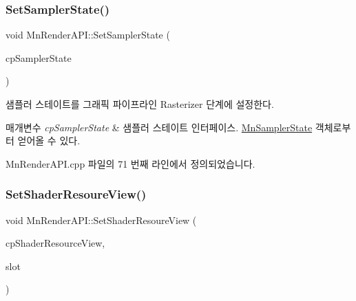 \mbox{\label{class_m_n_l_1_1_mn_render_a_p_i_a3d3c68e7fe4912e974d89ceeb357793e}} 
\subsubsection{\texorpdfstring{Set\+Sampler\+State()}{SetSamplerState()}}
{\footnotesize\ttfamily void Mn\+Render\+A\+P\+I\+::\+Set\+Sampler\+State (\begin{DoxyParamCaption}\item[{const \hyperlink{namespace_m_n_l_ae0141196161ecb3d3055523077ca3aa1}{C\+P\+D3\+D\+Sampler\+State} \&}]{cp\+Sampler\+State }\end{DoxyParamCaption})}



샘플러 스테이트를 그래픽 파이프라인 Rasterizer 단계에 설정한다. 


\begin{DoxyParams}{매개변수}
{\em cp\+Sampler\+State} & 샘플러 스테이트 인터페이스. \hyperlink{class_m_n_l_1_1_mn_sampler_state}{Mn\+Sampler\+State} 객체로부터 얻어올 수 있다. \\
\hline
\end{DoxyParams}


Mn\+Render\+A\+P\+I.\+cpp 파일의 71 번째 라인에서 정의되었습니다.

\mbox{\label{class_m_n_l_1_1_mn_render_a_p_i_a81810b5ebbfc1fe9cec78ed9e63ab0b0}} 
\subsubsection{\texorpdfstring{Set\+Shader\+Resoure\+View()}{SetShaderResoureView()}}
{\footnotesize\ttfamily void Mn\+Render\+A\+P\+I\+::\+Set\+Shader\+Resoure\+View (\begin{DoxyParamCaption}\item[{const \hyperlink{namespace_m_n_l_a93794d93663474ff79c950ed985565aa}{C\+P\+D3\+D\+Shader\+Resource\+View} \&}]{cp\+Shader\+Resource\+View,  }\item[{U\+I\+NT}]{slot }\end{DoxyParamCaption})}



